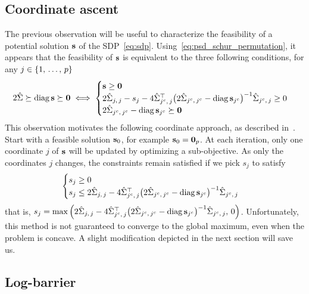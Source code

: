 \subsection{Coordinate ascent}\label{subsec:coordinate_ascent}

The previous observation will be useful to characterize the feasibility of a potential solution
$\mathbf{s}$ of the SDP~\ref{eq:sdp}.
Using~\ref{eq:psd_schur_permutation},
it appears that the feasibility of $\mathbf{s}$ is equivalent to the three following conditions,
for any $j \in \left\{ 1,\, \dots,\, p \right\}$
\begin{equation}\label{eq:schur_sdp_constraints}
    2\hat{\Sigma} \succeq \operatorname*{diag} \mathbf{s} \succeq \mathbf{0}
    \iff
    \begin{cases}
        \mathbf{s} \geq \mathbf{0}\\
        2\hat{\Sigma}_{j,\, j} - s_j
            - 4\hat{\Sigma}_{j^c,\, j}^\top\big( 2\hat{\Sigma}_{j^c,\, j^c} - \operatorname*{diag} \mathbf{s}_{j^c} \big)^{-1}\hat{\Sigma}_{j^c,\, j} \geq 0\\
        2\hat{\Sigma}_{j^c,\, j^c} - \operatorname*{diag} \mathbf{s}_{j^c} \succeq \mathbf{0}
    \end{cases}
\end{equation}
This observation motivates the following coordinate approach, as described in~\cite{block_coordinate_sdp}.
Start with a feasible solution $\mathbf{s}_0$, for example $\mathbf{s}_0 = \mathbf{0}_p$.
At each iteration, only one coordinate $j$ of $\mathbf{s}$ will be updated by optimizing
a sub-objective.
As only the coordinates $j$ changes, the constraints remain satisfied if we pick $s_j$ to satisfy
\begin{equation}\label{eq:sdp_simple_constraints}
    \begin{cases}
        s_j \geq 0\\
        s_j \leq 2\hat{\Sigma}_{j,\, j}
            - 4\hat{\Sigma}_{j^c,\, j}^\top\big( 2\hat{\Sigma}_{j^c,\, j^c} - \operatorname*{diag} \mathbf{s}_{j^c} \big)^{-1}\hat{\Sigma}_{j^c,\, j}
    \end{cases}
\end{equation}
that is,
$s_j = \max\Big( 2\hat{\Sigma}_{j,\, j}
    - 4\hat{\Sigma}_{j^c,\, j}^\top\big( 2\hat{\Sigma}_{j^c,\, j^c} - \operatorname*{diag} \mathbf{s}_{j^c} \big)^{-1}\hat{\Sigma}_{j^c,\, j}
    ,\, 0 \Big)
$.
Unfortunately, this method is not guaranteed to converge to the global maximum, even when the problem is concave.
A slight modification depicted in the next section will save us.

\subsection{Log-barrier}\label{subsec:log_barrier}

